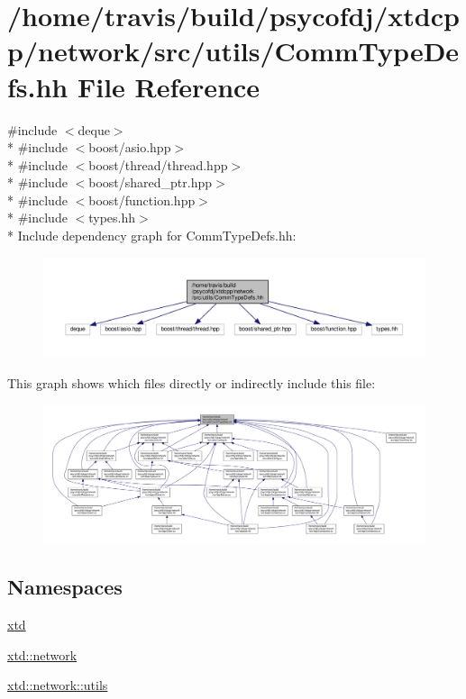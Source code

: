 \hypertarget{CommTypeDefs_8hh}{\section{/home/travis/build/psycofdj/xtdcpp/network/src/utils/\-Comm\-Type\-Defs.hh File Reference}
\label{CommTypeDefs_8hh}
}
{\ttfamily \#include $<$deque$>$}\\*
{\ttfamily \#include $<$boost/asio.\-hpp$>$}\\*
{\ttfamily \#include $<$boost/thread/thread.\-hpp$>$}\\*
{\ttfamily \#include $<$boost/shared\-\_\-ptr.\-hpp$>$}\\*
{\ttfamily \#include $<$boost/function.\-hpp$>$}\\*
{\ttfamily \#include $<$types.\-hh$>$}\\*
Include dependency graph for Comm\-Type\-Defs.\-hh\-:
\nopagebreak
\begin{figure}[H]
\begin{center}
\leavevmode
\includegraphics[width=350pt]{CommTypeDefs_8hh__incl}
\end{center}
\end{figure}
This graph shows which files directly or indirectly include this file\-:
\nopagebreak
\begin{figure}[H]
\begin{center}
\leavevmode
\includegraphics[width=350pt]{CommTypeDefs_8hh__dep__incl}
\end{center}
\end{figure}
\subsection*{Namespaces}
\begin{DoxyCompactItemize}
\item 
\hyperlink{namespacextd}{xtd}
\item 
\hyperlink{namespacextd_1_1network}{xtd\-::network}
\item 
\hyperlink{namespacextd_1_1network_1_1utils}{xtd\-::network\-::utils}
\end{DoxyCompactItemize}
